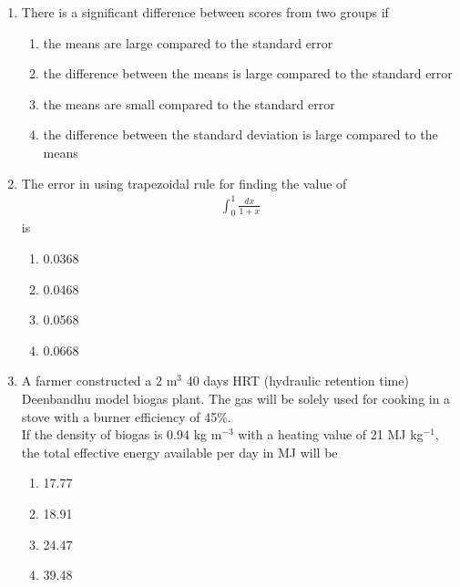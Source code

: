 \documentclass[journal]{IEEEtran}
\numberwithin{equation}{enumi}
\numberwithin{figure}{enumi}
\begin{document}
\begin{enumerate}
    \begin{multicols}{2}
    \begin{enumerate}
    \item consistent and has unique solution
    \item inconsistent and has no solution
    \item consistent and has infinite solutions
    \item inconsistent and has unique solution 
    \end{enumerate}
    \end{multicols}


    
\item There is a significant difference between scores from two groups if 

\begin{enumerate}
\item  the means are large compared to the standard error  \hfill{}
\item  the difference between the means is large compared to the standard error 
\item  the means are small compared to the standard error 
\item  the difference between the standard deviation is large compared to the means 
\end{enumerate}




\item The error in using trapezoidal rule for finding the value of
\begin{align*}
\int_0^1 \frac{dx}{1+x}    
\end{align*}
is \hfill{}
\begin{multicols}{4}
    \begin{enumerate}
    \item 0.0368
    \item 0.0468
    \item 0.0568
    \item 0.0668
    \end{enumerate}
    \end{multicols}


    
\item A farmer constructed a 2 m$^3$ 40 days HRT (hydraulic retention time) Deenbandhu model biogas plant. The gas will be solely used for cooking in a stove with a burner efficiency of 45\%. \\
If the density of biogas is 0.94 kg m$^{-3}$ with a heating value of 21 MJ kg$^{-1}$, the total effective energy available per day in MJ will be 
\hfill{}
\begin{multicols}{4}
    \begin{enumerate}
    \item 17.77
    \item 18.91
    \item 24.47
    \item 39.48
    \end{enumerate}
    \end{multicols}




\end{enumerate}
\end{document}
